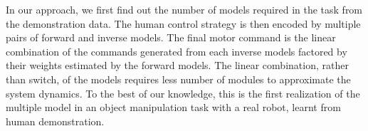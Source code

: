 In our approach, we first find out the number of models required in the task from the demonstration data. The human control strategy is then encoded by multiple pairs of forward and inverse models. The final motor command is the linear combination of the commands generated from each inverse models factored by their weights estimated by the forward models. The linear combination, rather than switch, of the models requires less number of modules to approximate the system dynamics. %
To the best of our knowledge, this is the first realization of the multiple model in an object manipulation task with a real robot, learnt from human demonstration.

%
%
%






%


